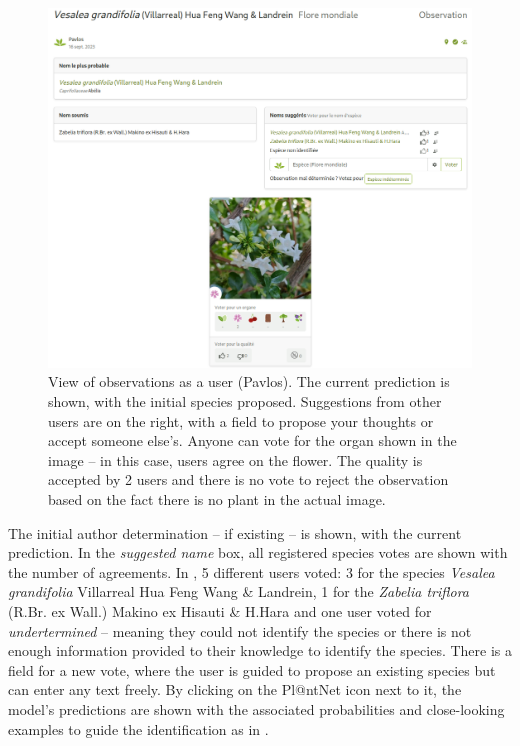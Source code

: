 \begin{figure}[tbh]
        \centering
        \includegraphics[width=.95\textwidth]{./images_plantnet/plantnet_others.png}
        \caption{View of observations as a user (\textcopyright Pavlos). The current prediction is shown, with the initial species proposed. Suggestions from other users are on the right, with a field to propose your thoughts or accept someone else's. Anyone can vote for the organ shown in the image -- in this case, users agree on the flower. The quality is accepted by 2 users and there is no vote to reject the observation based on the fact there is no plant in the actual image.}
        \label{fig:others_plantnet}
\end{figure}

The initial author determination -- if existing -- is shown, with the current prediction.
In the \emph{suggested name} box, all registered species votes are shown with the number of agreements.
In , 5 different users voted: 3 for the species \emph{Vesalea grandifolia} Villarreal Hua Feng Wang \& Landrein, 1 for the \emph{Zabelia triflora} (R.Br. ex Wall.) Makino ex Hisauti \& H.Hara and one user voted for \emph{undertermined} -- meaning they could not identify the species or there is not enough information provided to their knowledge to identify the species.
There is a field for a new vote, where the user is guided to propose an existing species but can enter any text freely.
By clicking on the Pl@ntNet icon next to it, the model's predictions are shown with the associated probabilities and close-looking examples to guide the identification as in .

